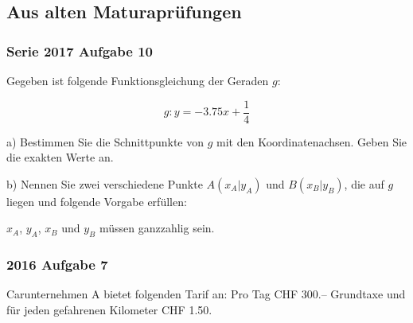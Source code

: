 \subsection{Aus alten Maturaprüfungen}

\subsubsection{Serie 2017 Aufgabe 10}

Gegeben ist folgende Funktionsgleichung der Geraden $g$:

$$g: y = -3.75x + \frac{1}{4}$$

a) Bestimmen Sie die Schnittpunkte von $g$ mit den Koordinatenachsen.
Geben Sie die exakten Werte an.



b) Nennen Sie zwei verschiedene Punkte $A(x_A | y_A)$ und $B(x_B | y_B)$, die
auf $g$ liegen und folgende Vorgabe erfüllen:

$x_A$, $y_A$, $x_B$ und $y_B$ müssen ganzzahlig sein. 




\subsubsection{2016 Aufgabe 7}

Carunternehmen A bietet folgenden Tarif an:
Pro Tag CHF 300.-- Grundtaxe und für jeden gefahrenen Kilometer CHF 1.50.

